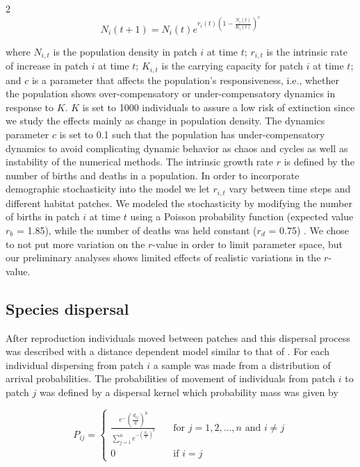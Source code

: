 \documentclass[12pt,pdftex]{article}
\begin{document}
\begin{spacing}{2}
\begin{equation}
N_{i}(t+1)= N_{i}(t)    e^{r_{i}(t)(1-\frac{N_{i}(t)}{K_{i}(t)})^c}	
\end{equation}	

where $N_{i,t}$ is the population density in patch $i$ at time $t$; $r_{i,t}$ is the intrinsic rate of increase in patch $i$ at time $t$; $K_{i,t}$ is the carrying capacity for patch $i$ at time $t$; and $c$ is a parameter that affects the population's responsiveness, i.e., whether the population shows over-compensatory or under-compensatory dynamics in response to $K$.  $K$  is set to 1000 individuals to assure a low risk of extinction since we study the effects mainly as change in population density. The dynamics parameter $c$ is set to 0.1 such that the population has under-compensatory dynamics to avoid complicating dynamic behavior as chaos and cycles as well as instability of the numerical methods. The intrinsic growth rate $r$ is defined by the number of births and deaths in a population. In order to incorporate demographic stochasticity into the model we let $r_{i,t}$ vary between time steps and different habitat patches. We modeled the stochasticity by modifying the number of births in patch $i$ at time $t$ using a Poisson probability function (expected value $r_{b}$ = 1.85),  while the number of deaths was held constant  ($r_{d}$ = 0.75) \citep{Melbourne2008}. We chose to not put more variation on the $r$-value in order to limit parameter space, but our preliminary analyses shows limited effects of realistic variations in the $r$-value. 

\subsection*{Species dispersal}
After reproduction individuals moved between patches and this dispersal process was described with a distance dependent model similar to that of \cite{Lindstrom2009}. For each individual dispersing from patch $i$ a sample was made from a distribution of arrival probabilities. The probabilities of movement of individuals from patch $i$ to patch $j$ was defined by a dispersal kernel which probability mass was given by

\begin{equation}
	P_{ij}=  
	\begin{cases} 
		\frac{e^-(\frac{d_{ij}}{a})^b}{\sum_{j=1}^{n}e^{-(\frac{d_{ij}}{a})^b}}   
				& \quad \text{for } j = 1,2,...,n \text{ and } i\neq j  \\    
		0 & \quad \text{if } i=j
	\end{cases}
\end{equation}



\end{spacing}
\end{document}
